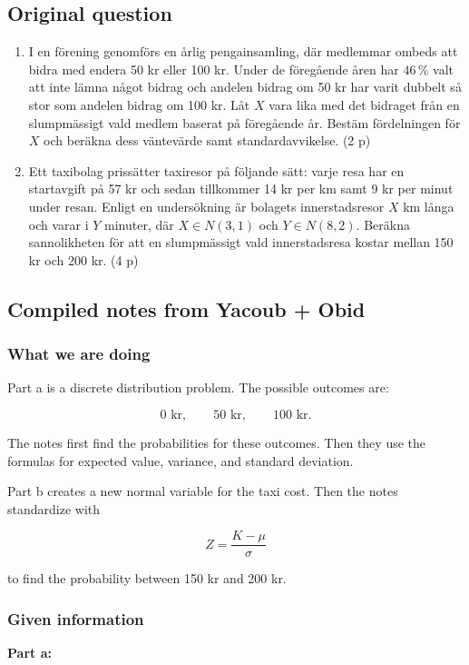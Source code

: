 \documentclass[10pt]{article}
\begin{document}
\subsection*{Original question}
\begin{enumerate}[label=\alph*)]
\item
I en förening genomförs en årlig pengainsamling, där medlemmar
ombeds att bidra med endera 50 kr eller 100 kr. Under de föregående
åren har $46\,\%$ valt att inte lämna något bidrag och andelen bidrag
om 50 kr har varit dubbelt så stor som andelen bidrag om 100 kr.
Låt $X$ vara lika med det bidraget från en slumpmässigt vald medlem
baserat på föregående år. Bestäm fördelningen för $X$ och beräkna
dess väntevärde samt standardavvikelse.
\hfill (2 p)

\item
Ett taxibolag prissätter taxiresor på följande sätt: varje resa har
en startavgift på 57 kr och sedan tillkommer 14 kr per km samt
9 kr per minut under resan. Enligt en undersökning är bolagets
innerstadsresor $X$ km långa och varar i $Y$ minuter, där
$X\in N(3,1)$ och $Y\in N(8,2)$. Beräkna sannolikheten för att en
slumpmässigt vald innerstadsresa kostar mellan 150 kr och 200 kr.
\hfill (4 p)
\end{enumerate}

\subsection*{Compiled notes from Yacoub + Obid}

\subsubsection*{What we are doing}
Part a is a discrete distribution problem.
The possible outcomes are:

\[
0\text{ kr},\qquad 50\text{ kr},\qquad 100\text{ kr}.
\]

The notes first find the probabilities for these outcomes.
Then they use the formulas for expected value, variance,
and standard deviation.

Part b creates a new normal variable for the taxi cost.
Then the notes standardize with

\[
Z=\frac{K-\mu}{\sigma}
\]

to find the probability between 150 kr and 200 kr.

\subsubsection*{Given information}
\textbf{Part a:}
\end{document}
